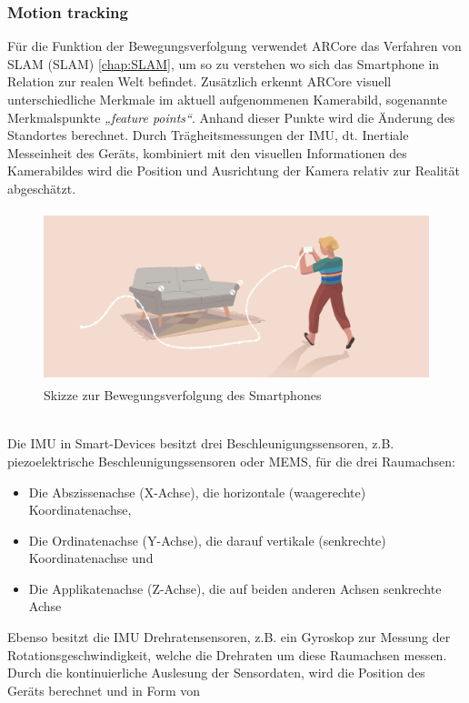 \subsubsection*{Motion tracking}
Für die Funktion der Bewegungsverfolgung verwendet ARCore das Verfahren von \acl{SLAM} (\acs{SLAM}) \ref{chap:SLAM}, um so zu verstehen wo 
sich das Smartphone in Relation zur realen Welt befindet. Zusätzlich erkennt ARCore visuell unterschiedliche Merkmale im aktuell aufgenommenen 
Kamerabild, sogenannte Merkmalspunkte \textit{„feature points“}. Anhand dieser Punkte wird die Änderung des Standortes berechnet. Durch Trägheitsmessungen 
der \ac{IMU}, dt. Inertiale Messeinheit des Geräts, kombiniert mit den visuellen Informationen des Kamerabildes wird die Position und 
Ausrichtung der Kamera relativ zur Realität abgeschätzt. 
\begin{figure}[hbt!]
    \centering
    \includegraphics[width=15cm,height=5cm,keepaspectratio]{2Grundlagen/Bilder/motionTracking.png}
    \caption{Skizze zur Bewegungsverfolgung des Smartphones \cite{arcoreofficial.2020j}}
    \label{pic:motiontracking}
\end{figure}
\\ 
Die \acl{IMU} in Smart-Devices besitzt drei Beschleunigungssensoren, z.B. piezoelektrische Beschleunigungssensoren oder \ac{MEMS}, für die 
drei Raumachsen:
\\ 
\begin{itemize}
    \item Die Abszissenachse (X-Achse), die horizontale (waagerechte) Koordinatenachse,
    \item Die Ordinatenachse (Y-Achse), die darauf vertikale (senkrechte) Koordinatenachse und
    \item Die Applikatenachse (Z-Achse), die auf beiden anderen Achsen senkrechte Achse \cite{koordinatennorm.1973m}
\end{itemize}
Ebenso besitzt die \acs{IMU} Drehratensensoren, z.B. ein Gyroskop zur Messung der Rotationsgeschwindigkeit, welche die Drehraten um 
diese Raumachsen messen. Durch die kontinuierliche Auslesung der Sensordaten, wird die Position des Geräts berechnet und in Form von 
